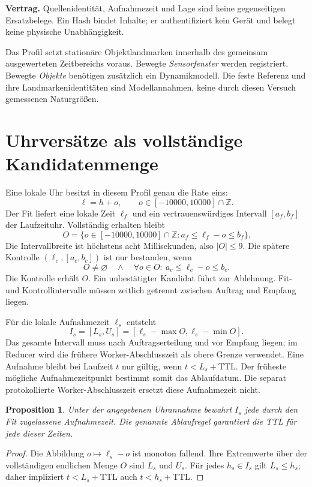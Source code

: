 \documentclass[11pt,a4paper]{article}
\newcommand{\contract}[1]{\vspace{3pt}\noindent\colorbox{pale}{\parbox{\dimexpr\linewidth-2\fboxsep}{\textbf{Vertrag.} #1}}\vspace{5pt}}
\newcommand{\nextsection}[2]{\clearpage{\color{accent}\small\textsf{#1}}\section{#2}}
\newtheorem{proposition}{Proposition}[section]
\begin{document}
\contract{Quellenidentität, Aufnahmezeit und Lage sind keine
gegenseitigen Ersatzbelege. Ein Hash bindet Inhalte; er authentifiziert
kein Gerät und belegt keine physische Unabhängigkeit.}

Das Profil setzt stationäre Objektlandmarken innerhalb des gemeinsam
ausgewerteten Zeitbereichs voraus. Bewegte \emph{Sensorfenster}
werden registriert. Bewegte \emph{Objekte} benötigen zusätzlich ein
Dynamikmodell. Die feste Referenz und ihre Landmarkenidentitäten
sind Modellannahmen, keine durch diesen Versuch gemessenen Naturgrößen.

\nextsection{77 / ZEITREGISTRIERUNG}{Uhrversätze als vollständige Kandidatenmenge}
Eine lokale Uhr besitzt in diesem Profil genau die Rate eins:
\[
\ell=h+o,\qquad o\in[-10000,10000]\cap\mathbb Z.
\]
Der Fit liefert eine lokale Zeit $\ell_f$ und ein vertrauenswürdiges
Intervall $[a_f,b_f]$ der Laufzeituhr. Vollständig erhalten bleibt
\[
O=\{o\in[-10000,10000]\cap\mathbb Z:
             a_f\leq\ell_f-o\leq b_f\}.
\]
Die Intervallbreite ist höchstens acht Millisekunden, also $|O|\leq9$.
Die spätere Kontrolle $(\ell_c,[a_c,b_c])$ ist nur bestanden, wenn
\[
O\ne\varnothing\quad\land\quad
\forall o\in O:\ a_c\leq\ell_c-o\leq b_c.
\]
Die Kontrolle erhält $O$. Ein unbestätigter Kandidat führt zur
Ablehnung. Fit- und Kontrollintervalle müssen
zeitlich getrennt zwischen Auftrag und Empfang liegen.

Für die lokale Aufnahmezeit $\ell_s$ entsteht
\[
I_s=[L_s,U_s]=[\ell_s-\max O,\ell_s-\min O].
\]
Das gesamte Intervall muss nach Auftragserteilung und vor Empfang
liegen; im Reducer wird die frühere Worker-Abschlusszeit als
obere Grenze verwendet. Eine Aufnahme bleibt bei Laufzeit $t$ nur gültig, wenn
$t<L_s+\mathrm{TTL}$. Der früheste mögliche Aufnahmezeitpunkt
bestimmt somit das Ablaufdatum. Die separat protokollierte
Worker-Abschlusszeit ersetzt diese Aufnahmezeit nicht.

\begin{proposition}
Unter der angegebenen Uhrannahme bewahrt $I_s$ jede durch den Fit
zugelassene Aufnahmezeit. Die genannte Ablaufregel garantiert die
TTL für jede dieser Zeiten.
\end{proposition}
\begin{proof}
Die Abbildung $o\mapsto\ell_s-o$ ist monoton fallend. Ihre Extremwerte
über der vollständigen endlichen Menge $O$ sind $L_s$ und $U_s$.
Für jedes $h_s\in I_s$ gilt $L_s\leq h_s$; daher impliziert
$t<L_s+\mathrm{TTL}$ auch $t<h_s+\mathrm{TTL}$.
\end{proof}
\end{document}
